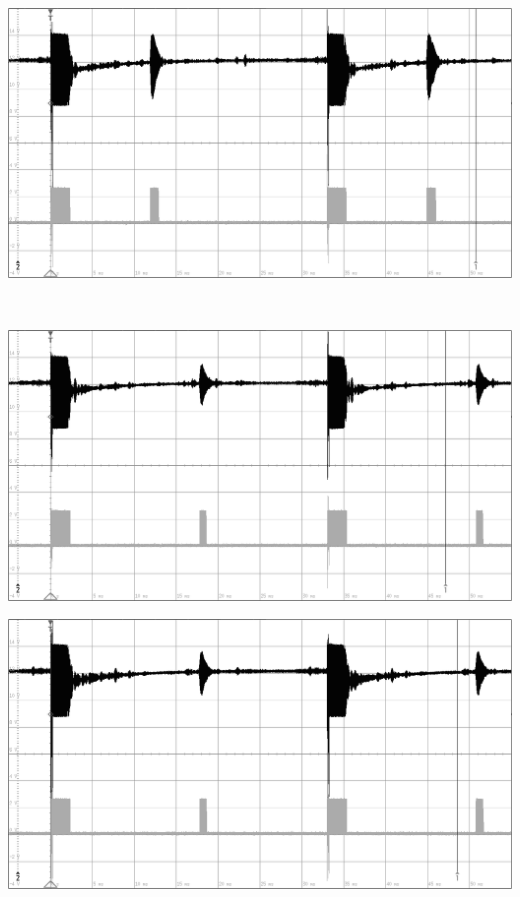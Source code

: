 \begin{minipage}{0.46\textwidth}
\includegraphics[width=1\textwidth%
]{Abbildungen/MessungenP2/20V/2m.PNG}
\end{minipage}\\
\begin{minipage}{0.46\textwidth}
\includegraphics[width=1\textwidth%
]{Abbildungen/MessungenP2/15V/3m.PNG}
\end{minipage}\qquad
\begin{minipage}{0.46\textwidth}
\includegraphics[width=1\textwidth%
]{Abbildungen/MessungenP2/20V/3m.PNG}
\end{minipage}\\
